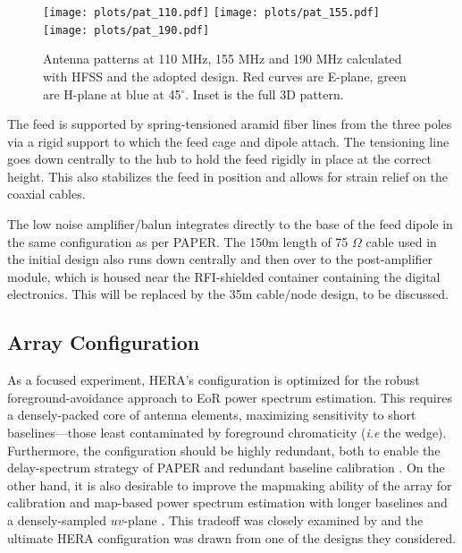 \documentclass[preprint,11pt]{aastex}
\begin{document}
\begin{figure}[h!]
\centerline{
\texttt{[image: plots/pat\_110.pdf]}
\texttt{[image: plots/pat\_155.pdf]}
\texttt{[image: plots/pat\_190.pdf]}
}
\caption{\small Antenna patterns at 110 MHz, 155 MHz and 190 MHz calculated with HFSS and the adopted design.  Red curves are E-plane, green are H-plane at blue at 45$^\circ$.  Inset is the full 3D pattern.}
\label{fig:beampatterns}
\end{figure}


The feed is supported by spring-tensioned aramid fiber lines from the three poles via a rigid support to which the feed cage and dipole attach.  The tensioning line goes down centrally to the hub to hold the feed rigidly in place at the correct height.  This also stabilizes the feed in position and allows for strain relief on the coaxial cables.  

The low noise amplifier/balun integrates directly to the base of the feed dipole in the same configuration as per PAPER.  The 150m length of 75 $\Omega$ cable used in the initial design also runs down centrally and then over to the post-amplifier module, which is housed near the RFI-shielded container containing the digital electronics.  This will be replaced by the 35m cable/node design, to be discussed.


\subsection{Array Configuration}
\label{sec:arrayConfig}

As a focused experiment, HERA's configuration is optimized for the robust foreground-avoidance approach to EoR power spectrum estimation. 
This requires a densely-packed core of antenna elements, maximizing sensitivity to short baselines---those least contaminated by foreground chromaticity ({\em i.e} the wedge). 
Furthermore, the configuration should be highly redundant, both to enable the delay-spectrum strategy of PAPER \citep{parsons_et_al2012a} and redundant baseline calibration \citep{liu_et_al2010,zheng_et_al2014}.
On the other hand, it is also desirable to improve the mapmaking ability of the array for calibration and map-based power spectrum estimation with longer baselines and a densely-sampled $uv$-plane \citep{dillon_et_al2015a}. This tradeoff was closely examined by \citet{dillon_parsons2016} and the ultimate HERA configuration was drawn from one of the designs they considered.
\end{document}
